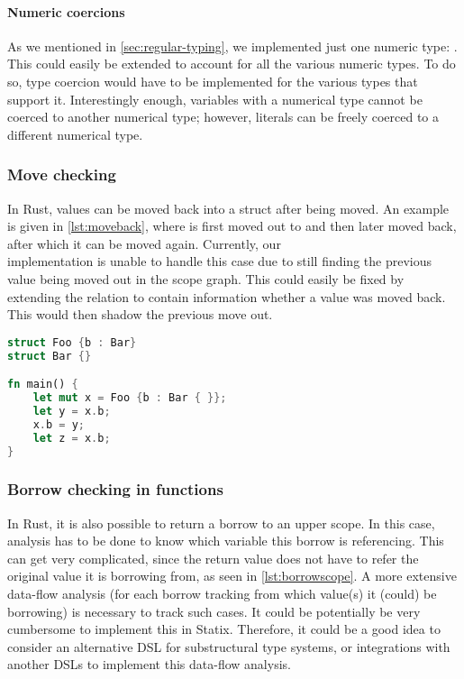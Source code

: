 \paragraph{Numeric coercions}

As we mentioned in \autoref{sec:regular-typing}, we implemented just one numeric type: . This could easily be extended to account for all the various numeric types. To do so, type coercion would have to be implemented for the various types that support it. Interestingly enough, variables with a numerical type cannot be coerced to another numerical type; however, literals can be freely coerced to a different numerical type.   

\subsubsection{Move checking}
In Rust, values can be moved back into a struct after being moved. An example is given in \autoref{lst:moveback}, where  is first moved out to  and then later moved back, after which it can be moved again. Currently, our\\ implementation is unable to handle this case due to still finding the previous value being moved out in the scope graph. This could easily be fixed by extending the relation to contain information whether a value was moved back. This would then shadow the previous move out.   

\begin{lstlisting}[language=rust, showstringspaces=false, escapechar=~, label={lst:moveback}, caption={Example of moving a value back}]
struct Foo {b : Bar}
struct Bar {}

fn main() { 
    let mut x = Foo {b : Bar { }}; 
    let y = x.b;
    x.b = y;
    let z = x.b; 
}
\end{lstlisting}

\subsubsection{Borrow checking in functions}

\label{sss:borrow-checking-in-functions}
In Rust, it is also possible to return a borrow to an upper scope. In this case, analysis has to be done to know which variable this borrow is referencing. This can get very complicated, since the return value does not have to refer the original value it is borrowing from, as seen in \autoref{lst:borrowscope}. A more extensive data-flow analysis (for each borrow tracking from which value(s) it (could) be borrowing) is necessary to track such cases. It could be potentially be very cumbersome to implement this in Statix. Therefore, it could be a good idea to consider an alternative DSL for substructural type systems, or integrations with another DSLs to implement this data-flow analysis. 

